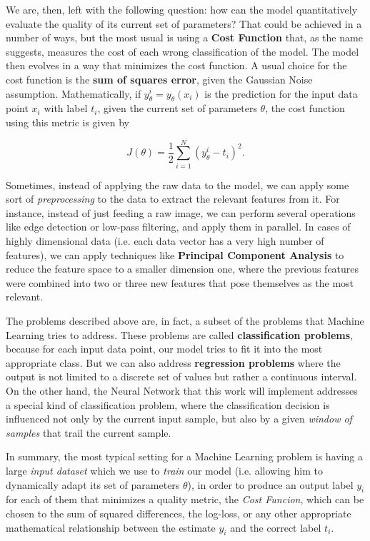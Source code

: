 We are, then, left with the following question: how can the model quantitatively evaluate the quality of its current set of parameters? That could be achieved in a number of ways, but the most usual is using a \textbf{Cost Function} that, as the name suggests, measures the cost of each wrong classification of the model. The model then evolves in a way that minimizes the cost function. A usual choice for the cost function is the \textbf{sum of squares error}, given the Gaussian Noise assumption. Mathematically, if $y_{\theta}^i = y_{\theta}(x_i)$ is the prediction for the input data point $x_i$ with label $t_i$, given the current set of parameters $\theta$, the cost function using this metric is given by

\begin{equation}\label{eq:costfunctionFund}
	J(\theta) = \frac{1}{2} \sum_{i=1}^N \left( y_{\theta}^i - t_i \right)^2.
\end{equation}

Sometimes, instead of applying the raw data to the model, we can apply some sort of \emph{preprocessing} to the data to extract the relevant features from it. For instance, instead of just feeding a raw image, we can perform several operations like edge detection or low-pass filtering, and apply them in parallel. In cases of highly dimensional data (i.e. each data vector has a very high number of features), we can apply techniques like \textbf{Principal Component Analysis} to reduce the feature space to a smaller dimension one, where the previous features were combined into two or three new features that pose themselves as the most relevant.

The problems described above are, in fact, a subset of the problems that Machine Learning tries to address. These problems are called \textbf{classification problems}, because for each input data point, our model tries to fit it into the most appropriate class. But we can also address \textbf{regression problems} where the output is not limited to a discrete set of values but rather a continuous interval. On the other hand, the Neural Network that this work will implement addresses a special kind of classification problem, where the classification decision is influenced not only by the current input sample, but also by a given \emph{window of samples} that trail the current sample.

In summary, the most typical setting for a Machine Learning problem is having a large \textit{input dataset} which we use to \textit{train} our model (i.e. allowing him to dynamically adapt its set of parameters $\theta$), in order to produce an output label $y_i$ for each of them that minimizes a quality metric, the \textit{Cost Funcion}, which can be chosen to the sum of squared differences, the log-loss, or any other appropriate  mathematical relationship  between the estimate $y_i$ and the correct label $t_i$. 

